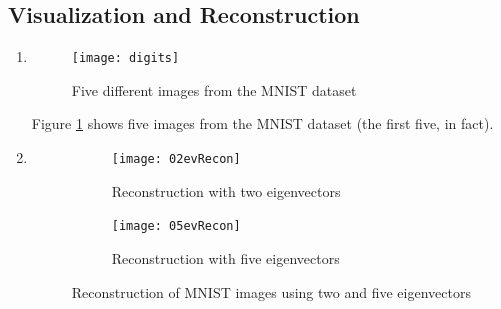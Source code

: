\documentclass{article}
\begin{document}
\subsection{Visualization and Reconstruction}
\begin{enumerate}
	\item 
	\begin{figure}
        \centering
        \texttt{[image: digits]}
        \caption{Five different images from the MNIST dataset} 
        \label{fig:digits}
    \end{figure}
    Figure \ref{fig:digits} shows five images from the MNIST dataset (the first five, in fact).
    \item 
    \begin{figure}
        \centering
        \begin{subfigure}[b]{0.95\textwidth}
        	\centering
        	\texttt{[image: 02evRecon]}
        	\caption{Reconstruction with two eigenvectors}
        	\label{fig:2ev}
        \end{subfigure}
        \begin{subfigure}[b]{0.95\textwidth}
        	\centering
        	\texttt{[image: 05evRecon]}
        	\caption{Reconstruction with five eigenvectors}
        	\label{fig:4ev}
        \end{subfigure}
        \caption{Reconstruction of MNIST images using two and five eigenvectors}
        \label{fig:evRecons1}
    \end{figure}


\end{enumerate}
\end{document}
